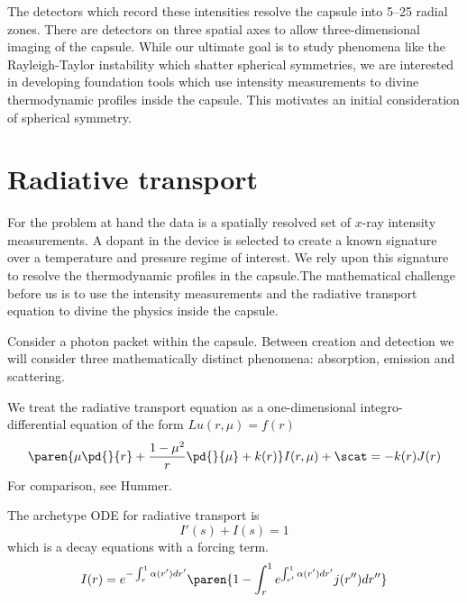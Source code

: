 \documentclass[final,leqno,onefignum,onetabnum]{siamltex1213}
\begin{document}
The detectors which record these intensities resolve the capsule into 5--25 radial zones. There are detectors on three spatial axes to allow three-dimensional imaging of the capsule. While our ultimate goal is to study phenomena like the Rayleigh-Taylor instability which shatter spherical symmetries, we are interested in developing foundation tools which use intensity measurements to divine thermodynamic profiles inside the capsule. This motivates an initial consideration of spherical symmetry.

\clearpage

\section{Radiative transport}
For the problem at hand the data is a spatially resolved set of $x$-ray intensity measurements. A dopant in the device is selected to create a known signature over a temperature and pressure regime of interest. We rely upon this signature to resolve the thermodynamic profiles in the capsule.The mathematical challenge before us is to use the intensity measurements and the radiative transport equation to divine the physics inside the capsule.

Consider a photon packet within the capsule. Between creation and detection we will consider three mathematically distinct phenomena: absorption, emission and scattering.

We treat the radiative transport equation as a one-dimensional integro-differential equation of the form $Lu(r,\mu)=f(r)$
  \begin{equation}
   \paren{ \mu \pd{}{r} + \frac{1-\mu^{2}}{r} \pd{}{\mu} + k(r)} I(r,\mu) + \scat \\
    = -k(r) J(r)
  \label{eq:intensity transport}
  \end{equation}
For comparison, see Hummer\cite{Hummer}.

The archetype ODE for radiative transport is
  \begin{equation}
    I'(s) + I(s) = 1
  \end{equation}
which is a decay equations with a forcing term.
  \begin{equation}
    I(r) = e^{-\int_{r}^{1} \alpha(r')dr'} \paren{ 1 - \int_{r}^{1} e^{\int_{r'}^{1}\alpha(r')dr'} j(r'')dr''}
  \end{equation}
\end{document}
